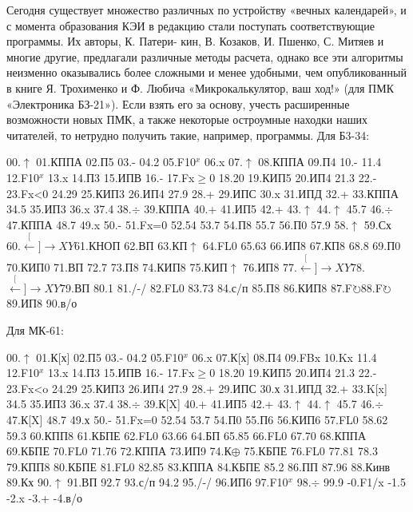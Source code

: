 \documentclass[11pt,a4paper,oneside]{article}
\def\XY{$\stackrel[\leftarrow]{\rightarrow}{XY}$}
\def\FO{F$\circlearrowright$}
\begin{document}
Сегодня существует множество различных по устройству «вечных календарей», и с момента образования КЭИ в редакцию стали поступать соответствующие программы. Их авторы, К. Патери- кин, В. Козаков, И. Пшенко, С. Митяев и многие другие, предлагали различные методы расчета, однако все эти алгоритмы неизменно оказывались более сложными и менее удобными, чем опубликованный в книге Я. Трохименко и Ф. Любича «Микрокалькулятор, ваш ход!» (для ПМК «Электроника БЗ-21»). Если взять его за основу, учесть расширенные возможности новых ПМК, а также некоторые остроумные находки наших читателей, то нетрудно получить такие, например, программы. Для Б3-34:

00.$\uparrow$ 01.КППА 02.П5 03.- 04.2 05.F10$^{x}$ 06.x 07.$\uparrow$ 08.КППА 09.П4 10.- 11.4 12.F10$^{x}$ 13.x 14.П3 15.ИПВ 16.- 17.Fx$\geq$0 18.20 19.КИП5 20.ИП4 21.3 22.- 23.Fx<0 24.29 25.КИП3 26.ИП4 27.9 28.+ 29.ИПС 30.x 31.ИПД 32.+ 33.КППА 34.5 35.ИП3 36.x 37.4 38.$\div$ 39.КППА 40.+ 41.ИП5 42.+ 43.$\uparrow$ 44.$\uparrow$ 45.7 46.$\div$ 47.КППА 48.7 49.x 50.- 51.Fx=0 52.54 53.7 54.П8 55.7 56.П0 57.9 58.$\uparrow$ 59.Сх 60.\XY 61.КНОП 62.ВП 63.КП$\uparrow$ 64.FL0 65.63 66.ИП8 67.КП8 68.8 69.П0 70.КИП0 71.ВП 72.7 73.П8 74.КИП8 75.КИП$\uparrow$ 76.ИП8 77.\XY 78.\XY 79.ВП 80.1 81./-/ 82.FL0 83.73 84.с/п 85.П8 86.КИП8 87.\FO 88.\FO 89.ИП8 90.в/о

Для МК-61:

00.$\uparrow$ 01.К[х] 02.П5 03.- 04.2 05.F10$^{x}$ 06.x 07.К[х] 08.П4 09.FBx 10.K{x} 11.4 12.F10$^{x}$ 13.x 14.П3 15.ИПВ 16.- 17.Fx$\geq$0 18.20 19.КИП5 20.ИП4 21.3 22.- 23.Fx<o 24.29 25.КИП3 26.ИП4 27.9 28.+ 29.ИПС 30.х 31.ИПД 32.+ 33.K[x] 34.5 35.ИП3 36.x 37.4 38.$\div$ 39.К[X] 40.+ 41.ИП5 42.+ 43.$\uparrow$ 44.$\uparrow$ 45.7 46.$\div$ 47.К[X] 48.7 49.х 50.- 51.Fx=0 52.54 53.7 54.П0 55.П6 56.КИП6 57.FL0 58.62 59.3 60.КПП8 61.КБПЕ 62.FL0 63.66 64.БП 65.85 66.FL0 67.70 68.КППА 69.КБПЕ 70.FL0 71.76 72.КППА 73.ИП9 74.К$\oplus$ 75.КБПЕ 76.FL0 77.81 78.3 79.КПП8 80.КБПЕ 81.FL0 82.85 83.КППА 84.КБПЕ 85.2 86.ПП 87.96 88.Кинв 89.К{х} 90.$\uparrow$ 91.ВП 92.7 93.с/п 94.2 95./-/ 96.ИП6 97.F10$^{x}$ 98.$\div$ 99.9 -0.F1/x -1.5 -2.x -3.+ -4.в/о
\end{document}
